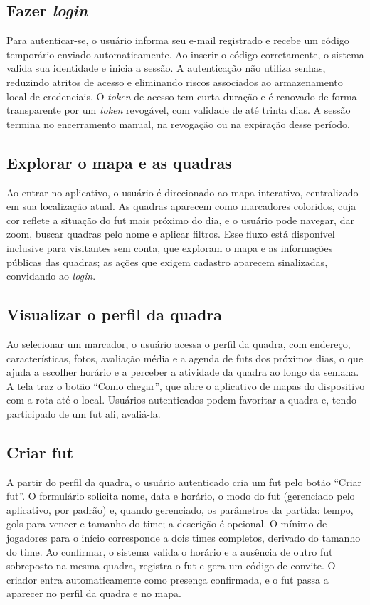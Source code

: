     \subsection{Fazer \textit{login}}
      Para autenticar-se, o usuário informa seu e-mail registrado e recebe um código temporário enviado automaticamente. Ao inserir o código corretamente, o sistema valida sua identidade e inicia a sessão. A autenticação não utiliza senhas, reduzindo atritos de acesso e eliminando riscos associados ao armazenamento local de credenciais. O \textit{token} de acesso tem curta duração e é renovado de forma transparente por um \textit{token} revogável, com validade de até trinta dias. A sessão termina no encerramento manual, na revogação ou na expiração desse período.

    \subsection{Explorar o mapa e as quadras}
      Ao entrar no aplicativo, o usuário é direcionado ao mapa interativo, centralizado em sua localização atual. As quadras aparecem como marcadores coloridos, cuja cor reflete a situação do fut mais próximo do dia, e o usuário pode navegar, dar zoom, buscar quadras pelo nome e aplicar filtros. Esse fluxo está disponível inclusive para visitantes sem conta, que exploram o mapa e as informações públicas das quadras; as ações que exigem cadastro aparecem sinalizadas, convidando ao \textit{login}.

    \subsection{Visualizar o perfil da quadra}
      Ao selecionar um marcador, o usuário acessa o perfil da quadra, com endereço, características, fotos, avaliação média e a agenda de futs dos próximos dias, o que ajuda a escolher horário e a perceber a atividade da quadra ao longo da semana. A tela traz o botão “Como chegar”, que abre o aplicativo de mapas do dispositivo com a rota até o local. Usuários autenticados podem favoritar a quadra e, tendo participado de um fut ali, avaliá-la.

    \subsection{Criar fut}
      A partir do perfil da quadra, o usuário autenticado cria um fut pelo botão “Criar fut”. O formulário solicita nome, data e horário, o modo do fut (gerenciado pelo aplicativo, por padrão) e, quando gerenciado, os parâmetros da partida: tempo, gols para vencer e tamanho do time; a descrição é opcional. O mínimo de jogadores para o início corresponde a dois times completos, derivado do tamanho do time. Ao confirmar, o sistema valida o horário e a ausência de outro fut sobreposto na mesma quadra, registra o fut e gera um código de convite. O criador entra automaticamente como presença confirmada, e o fut passa a aparecer no perfil da quadra e no mapa.

